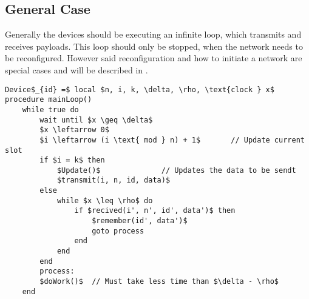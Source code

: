 \subsection{General Case} %
\label{sub:general_case}
Generally the devices should be executing an infinite loop, which transmits and receives payloads.
This loop should only be stopped, when the network needs to be reconfigured.
However said reconfiguration and how to initiate a network are special cases and will be described in .

\begin{lstlisting}[style=pseudocode,mathescape=true,caption={Pseudocode example of the main loop}] 
Device$_{id} =$ local $n, i, k, \delta, \rho, \text{clock } x$ 
procedure mainLoop()
	while true do
		wait until $x \geq \delta$
		$x \leftarrow 0$
		$i \leftarrow (i \text{ mod } n) + 1$		// Update current slot
		if $i = k$ then
			$Update()$				// Updates the data to be sendt
			$transmit(i, n, id, data)$
		else 
			while $x \leq \rho$ do
				if $recived(i', n', id', data')$ then
					$remember(id', data')$
					goto process
				end
			end
		end
		process:
		$doWork()$	// Must take less time than $\delta - \rho$	
	end
\end{lstlisting}  

            
